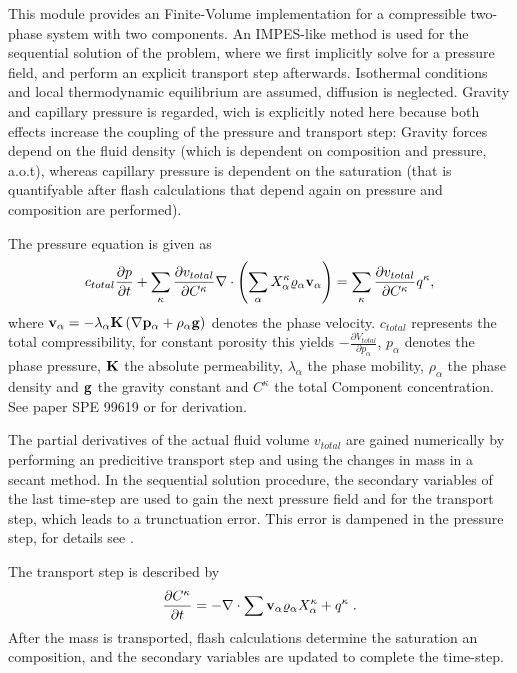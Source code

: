 This module provides an Finite-Volume implementation for a compressible two-phase system with two components. An IMPES-like method is used for the sequential solution of the problem, where we first implicitly solve for a pressure field, and perform an explicit transport step afterwards. Isothermal conditions and local thermodynamic equilibrium are assumed, diffusion is neglected. Gravity and capillary pressure is regarded, wich is explicitly noted here because both effects increase the coupling of the pressure and transport step: Gravity forces depend on the fluid density (which is dependent on composition and pressure, a.o.t), whereas capillary pressure is dependent on the saturation (that is quantifyable after flash calculations that depend again on pressure and composition are performed).

The pressure equation is given as
\begin{equation}
  c_{total}\frac{\partial p}{\partial t} + \sum_{\kappa} \frac{\partial v_{total}}{\partial C^{\kappa}} \nabla \cdot \left( \sum_{\alpha} X^{\kappa}_{\alpha} \varrho_{\alpha} \bf{v}_{\alpha}\right)
  = \sum_{\kappa} \frac{\partial v_{total}}{\partial C^{\kappa}} q^{\kappa},
\end{equation}
where $\bf{v}_{\alpha} = - \lambda_{\alpha} \bf{K} \left(\nabla p_{\alpha} + \rho_{\alpha} \bf{g} \right) $ denotes the phase velocity.
$ c_{total} $ represents the total compressibility, for constant porosity this yields $ - \frac{\partial V_{total}}{\partial p_{\alpha}}$,
$p_{\alpha} $ denotes the phase pressure, $ \bf{K} $ the absolute permeability, $ \lambda_{\alpha} $ the phase mobility,
$ \rho_{\alpha} $ the phase density and $ \bf{g}$ the gravity constant and $ C^{\kappa} $ the total Component concentration.
See paper SPE 99619 or \cite{Chen2000} for derivation.

The partial derivatives of the actual fluid volume $ v_{total} $ are gained numerically by performing an predicitive transport step and using the changes in mass in a secant method. In the sequential solution procedure, the secondary variables of the last time-step
are used to gain the next pressure field and for the transport step, which leads to a trunctuation error. This error is dampened in the pressure step, for details see \cite{Fritz2010}.

The transport step is described by
\[ \frac{\partial C^\kappa}{\partial t} = - \nabla \cdot \sum{{\bf v_\alpha} \varrho_\alpha X_\alpha^\kappa} + q^\kappa \; . \]
After the mass is transported, flash calculations determine the saturation an composition, and the secondary variables are updated to complete the time-step.
